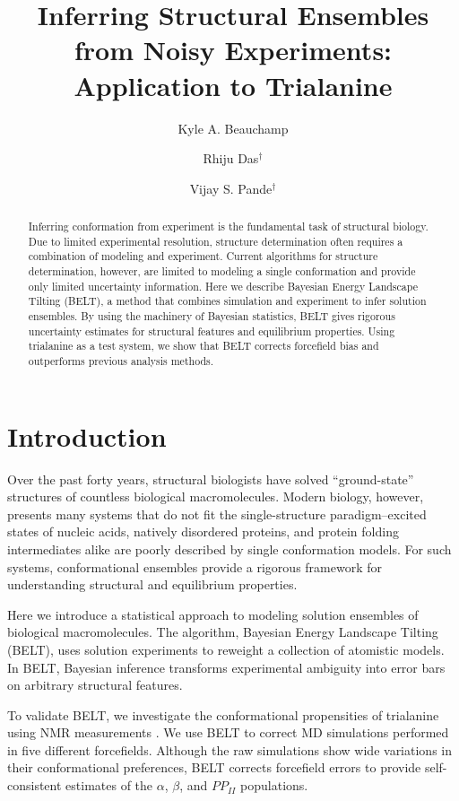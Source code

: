 \documentclass[journal=jacsat,manuscript=article]{achemso}
\author{Kyle A. Beauchamp}
\affiliation[Biophysics Program]{Biophysics Program}
\author{Rhiju Das$^\dagger$}
\affiliation[Biochemistry Department]{Biochemistry Department, Stanford University, Stanford, CA}
\author{Vijay S. Pande$^\dagger$}
\affiliation[Chemistry Department]{Chemistry Department, Stanford University, Stanford, CA}
\title{Inferring Structural Ensembles from Noisy Experiments: Application to Trialanine}
\begin{document}
\maketitle

\begin{abstract}

Inferring conformation from experiment is the fundamental task of structural biology.  Due to limited experimental resolution, structure determination often requires a combination of modeling and experiment.  Current algorithms for structure determination, however, are limited to modeling a single conformation and provide only limited uncertainty information.  Here we describe Bayesian Energy Landscape Tilting (BELT), a method that combines simulation and experiment to infer solution ensembles.  By using the machinery of Bayesian statistics, BELT  gives rigorous uncertainty estimates for structural features and equilibrium properties.  Using trialanine as a test system, we show that BELT corrects forcefield bias and outperforms previous analysis methods.

\end{abstract}

\section{Introduction}

Over the past forty years, structural biologists have solved ``ground-state'' structures of countless biological macromolecules\cite{Berman2000}. Modern biology, however, presents many systems that do not fit the single-structure paradigm--excited states of nucleic acids\cite{dethoff2012}, natively disordered proteins\cite{fink2005}, and protein folding intermediates\cite{korzhnev2004} alike are poorly described by single conformation models.  For such systems, conformational ensembles provide a rigorous framework for understanding structural and equilibrium properties.  

Here we introduce a statistical approach to modeling solution ensembles of biological macromolecules.  The algorithm, Bayesian Energy Landscape Tilting (BELT), uses solution experiments to reweight a collection of atomistic models.  In BELT, Bayesian inference transforms experimental ambiguity into error bars on arbitrary structural features.  

To validate BELT, we investigate the conformational propensities of trialanine using NMR measurements \cite{Graf2007}.  We use BELT to correct MD simulations performed in five different forcefields.  Although the raw simulations show wide variations in their conformational preferences, BELT corrects forcefield errors to provide self-consistent estimates of the $\alpha$, $\beta$, and $PP_{II}$ populations.  
\end{document}
